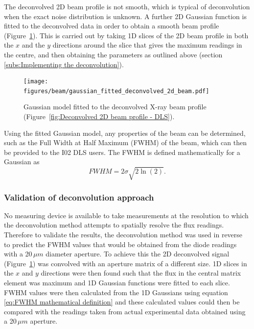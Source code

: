 The deconvolved 2D beam profile is not smooth, which is typical of deconvolution when the exact noise distribution is unknown.
A further 2D Gaussian function is fitted to the deconvolved data in order to obtain a smooth beam profile (Figure~\ref{fig:Gaussian model fitted to the 2D deconvolved profile - DLS}).
This is carried out by taking 1D slices of the 2D beam profile in both the $x$ and the $y$ directions around the slice that gives the maximum readings in the centre, and then obtaining the parameters as outlined above (section \ref{subs:Implementing the deconvolution}).
\begin{figure}
    \centering
    \texttt{[image: figures/beam/gaussian\_fitted\_deconvolved\_2d\_beam.pdf]}
    \caption[Gaussian model fitted to the deconvolved X-ray beam profile.]{Gaussian model fitted to the deconvolved X-ray beam profile (Figure~\ref{fig:Deconvolved 2D beam profile - DLS}).}
    \label{fig:Gaussian model fitted to the 2D deconvolved profile - DLS}
\end{figure}

Using the fitted Gaussian model, any properties of the beam can be determined, such as the Full Width at Half Maximum (FWHM) of the beam, which can then be provided to the I02 DLS users.
The FWHM is defined mathematically for a Gaussian as
\begin{equation}
FWHM = 2 \sigma \sqrt{2\ln(2)}.
\label{eq:FWHM mathematical definition}
\end{equation}

\subsubsection{Validation of deconvolution approach}
\label{subs:Validation of deconvolution approach}
No measuring device is available to take measurements at the resolution to which the deconvolution method attempts to spatially resolve the flux readings.
Therefore to validate the results, the deconvolution method was used in reverse to predict the FWHM values that would be obtained from the diode readings with a 20$\,\mu m$ diameter aperture.
To achieve this the 2D deconvolved signal (Figure~\ref{fig:Gaussian model fitted to the 2D deconvolved profile - DLS}) was convolved with an aperture matrix of a different size.
1D slices in the $x$ and $y$ directions were then found such that the flux in the central matrix element was maximum and 1D Gaussian functions were fitted to each slice.
FWHM values were then calculated from the 1D Gaussians using equation \ref{eq:FWHM mathematical definition} and these calculated values could then be compared with the readings taken from actual experimental data obtained using a 20$\,\mu m$ aperture.

